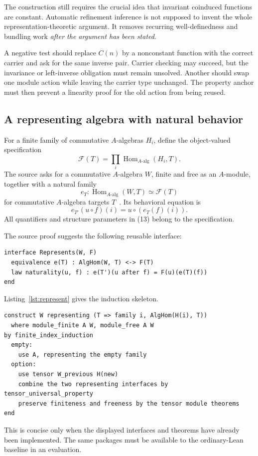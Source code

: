 \documentclass[11pt,letterpaper]{article}
\theoremstyle{definition}
\theoremstyle{remark}
\begin{document}
The construction still requires the crucial idea that invariant coinduced
functions are constant. Automatic refinement inference is not supposed to
invent the whole representation-theoretic argument. It removes recurring
well-definedness and bundling work \emph{after the argument has been stated}.

A negative test should replace $C(n)$ by a nonconstant function with the correct
carrier and ask for the same inverse pair. Carrier checking may succeed, but the
invariance or left-inverse obligation must remain unsolved. Another should swap
one module action while leaving the carrier type unchanged. The property anchor
must then prevent a linearity proof for the old action from being reused.

\subsection{A representing algebra with natural behavior}\label{sec:tensor}
For a finite family of commutative $A$-algebras $H_i$, define the object-valued
specification
\[
\mathcal F(T)=\prod_i\operatorname{Hom}_{A\text{-alg}}(H_i,T).
\]
The source asks for a commutative $A$-algebra $W$, finite and free as an
$A$-module, together with a natural family
\[
e_T:\operatorname{Hom}_{A\text{-alg}}(W,T)\simeq\mathcal F(T)
\tag{12}
\]
for commutative $A$-algebra targets $T$~\cite{FTensor}. Its behavioral equation is
\[
e_{T'}(u\circ f)(i)=u\circ(e_T(f)(i)).
\tag{13}
\]
All quantifiers and structure parameters in (13) belong to the specification.

The source proof suggests the following reusable interface:
\begin{lstlisting}
interface Represents(W, F)
  equivalence e(T) : AlgHom(W, T) <-> F(T)
  law naturality(u, f) : e(T')(u after f) = F(u)(e(T)(f))
end
\end{lstlisting}
Listing~\ref{lst:represent} gives the induction skeleton.
\begin{lstlisting}[float=htbp,caption={A finite representing-family construction.},captionpos=t,label={lst:represent}]
construct W representing (T => family i, AlgHom(H(i), T))
  where module_finite A W, module_free A W
by finite_index_induction
  empty:
    use A, representing the empty family
  option:
    use tensor W_previous H(new)
    combine the two representing interfaces by tensor_universal_property
    preserve finiteness and freeness by the tensor module theorems
end
\end{lstlisting}
This is concise only when the displayed interfaces and theorems have already
been implemented. The same packages must be available to the ordinary-Lean
baseline in an evaluation.
\end{document}
